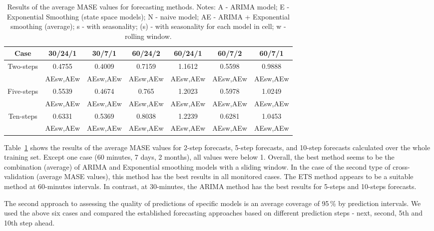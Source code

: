 \documentclass[runningheads]{llncs}
\begin{document}
\begin{table}[h]
    \centering
    \begin{tabular}{c|c|c|c|c|c|c} \hline
        Case & \,30/24/1\, & \,30/7/1\, & \,60/24/2\, & \,60/24/1\, & \,60/7/2\, & \,60/7/1\, \\    
        \hline\hline
       \multirow{2}{*}{Two-steps} & 0.4755 & 0.4009 & 0.7159 & 1.1612 & 0.5598 & 0.9888 \\
       & AEsw,AEw & AEsw,AEw & AEsw,AEw & AEsw,AEw & AEsw,AEw & AEsw,AEw  \\
        \hline
        \multirow{2}{*}{Five-steps} & 0.5539 & 0.4674 & 0.765 & 1.2023 & 0.5978 & 1.0249 \\
        & AEsw,AEw & AEsw,AEw & AEsw,AEw & AEsw,AEw & AEsw,AEw & AEsw,AEw  \\
        \hline
        \multirow{2}{*}{Ten-steps} & 0.6331 & 0.5369 & 0.8038 & 1.2239 & 0.6281 & 1.0453 \\
        & AEsw,AEw & AEsw,AEw & AEsw,AEw & AEsw,AEw & AEsw,AEw & AEsw,AEw  \\
        \hline     
    \end{tabular}
    \caption{Results of the average MASE values for forecasting methods. Notes: A - ARIMA model; E - Exponential Smoothing (state space models); N - naive model; AE - ARIMA + Exponential smoothing (average); s - with seasonality; (s) - with seasonality for each model in cell; w - rolling window.}
    \label{tab:mase}
\end{table}

Table~\ref{tab:mase} shows the results of the average MASE values for 2-step forecasts, 5-step forecasts, and 10-step forecasts calculated over the whole training set. Except one case (60 minutes, 7 days, 2 months), all values were below 1. Overall, the best method seems to be the combination (average) of ARIMA and Exponential smoothing models with a sliding window. In the case of the second type of cross-validation (average MASE values), this method has the best results in all monitored cases. The ETS method appears to be a suitable method at 60-minutes intervals. In contrast, at 30-minutes, the ARIMA method has the best results for 5-steps and 10-steps forecasts. 


The second approach to assessing the quality of predictions of specific models is an average coverage of 95\,\% by prediction intervals. We used the above six cases and compared the established forecasting approaches based on different prediction steps - next, second, 5th and 10th step ahead. 
\end{document}
